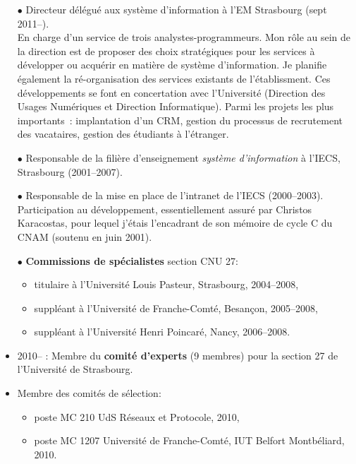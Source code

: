 \documentclass[11pt]{article}
\begin{document}
\begin{itemize}
\item[$\bullet$] Directeur délégué aux système d'information à l'EM Strasbourg (sept 2011--).\\
En charge d'un service de trois analystes-programmeurs. Mon rôle au sein de la direction
est de proposer des choix stratégiques pour les services à développer ou acquérir en matière 
de système d'information. Je planifie également la ré-organisation des services existants de 
l'établissment. Ces développements se font en concertation avec l'Université (Direction des 
Usages Numériques et Direction Informatique). Parmi les projets les plus importants~: 
implantation d'un CRM, gestion du processus de recrutement des vacataires, gestion des
étudiants à l'étranger.\\
		

\item[$\bullet$] Responsable de la filière d'enseignement \emph{système d'information} à l'IECS, Strasbourg (2001--2007).\\

\item[$\bullet$] 
Responsable de la mise en place de l'intranet de l'IECS (2000--2003). 
Participation au développement, essentiellement assuré par Christos Karacostas,
pour lequel j'étais l'encadrant de son mémoire de cycle C du CNAM (soutenu en juin 2001).\\

\item[$\bullet$] \textbf{Commissions de spécialistes} section CNU 27:
	\begin{itemize}
		\item titulaire à l'Université Louis Pasteur, Strasbourg, 2004--2008,
		\item suppléant à l'Université de Franche-Comté, Besançon, 2005--2008,
		\item suppléant à l'Université Henri Poincaré, Nancy, 2006--2008.\\
	\end{itemize}
	\item 2010-- : Membre du \textbf{comité d'experts} (9 membres) pour la section 
		27 de l'Université de Strasbourg.
	\item Membre des comités de sélection:
	\begin{itemize}
		\item poste MC 210 UdS Réseaux et Protocole, 2010,
		\item poste MC 1207 Université de Franche-Comté, IUT Belfort Montbéliard, 2010.\\
	\end{itemize}



\end{itemize}
\end{document}
